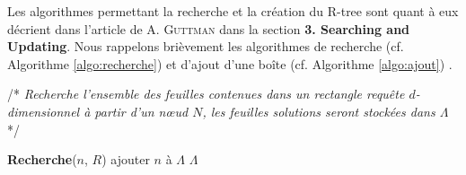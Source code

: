 Les algorithmes permettant la recherche et la création du R-tree sont quant à eux décrient dans l'article de \textsc{A. Guttman} dans la section \textbf{3. Searching and Updating}\cite{Guttman}. Nous rappelons brièvement les algorithmes de recherche (cf. Algorithme \ref{algo:recherche}) et d'ajout d'une boîte (cf. Algorithme \ref{algo:ajout}) \cite{poulos}.

\begin{algorithm}
/* \textit{Recherche l'ensemble des feuilles contenues dans un rectangle requête $d$-dimensionnel à partir d'un nœud $N$, les feuilles solutions seront stockées dans $\Lambda$} */
\label{algo:recherche}
\begin{algorithmic}[1]
    \STATE \textbf{Recherche}($n$, $R$)
  \ENDFOR
{}%
    \STATE ajouter $n$ à $\Lambda$
  \ENDFOR
\ENDIF
\RETURN $\Lambda$
\end{algorithmic}
\end{algorithm}

